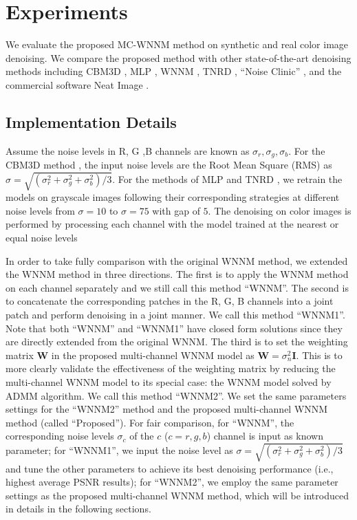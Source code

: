 \documentclass[10pt,twocolumn,letterpaper,sort&compress]{article}
\begin{document}
\section{Experiments}
We evaluate the proposed MC-WNNM method on synthetic and real color image denoising. We compare the proposed method with other state-of-the-art denoising methods including CBM3D \cite{bm3d,cbm3d}, MLP \cite{mlp}, WNNM \cite{wnnm}, TNRD \cite{chen2015learning}, ``Noise Clinic'' \cite{noiseclinic,ncwebsite}, and the commercial software Neat Image \cite{neatimage}.

\subsection{Implementation Details}

Assume the noise levels in R, G ,B channels are known as $\sigma_{r}, \sigma_{g}, \sigma_{b}$. For the CBM3D method \cite{cbm3d}, the input noise levels are the Root Mean Square (RMS) as $\sigma = \sqrt{(\sigma_{r}^{2}+\sigma_{g}^{2}+\sigma_{b}^{2})/3}$. For the methods of MLP \cite{mlp} and TNRD \cite{chen2015learning}, we retrain the models on grayscale images following their corresponding strategies at different noise levels from $\sigma=10$ to $\sigma=75$ with gap of $5$. The denoising on color images is performed by processing each channel with the model trained at the nearest or equal noise levels 

In order to take fully comparison with the original WNNM method, we extended the WNNM method \cite{wnnmijcv} in three directions. The first is to apply the WNNM method on each channel separately and we still call this method ``WNNM''. The second is to concatenate the corresponding patches in the R, G, B channels into a joint patch and perform denoising in a joint manner. We call this method ``WNNM1''. Note that both ``WNNM'' and ``WNNM1'' have closed form solutions since they are directly extended from the original WNNM. The third is to set the weighting matrix $\mathbf{W}$ in the proposed multi-channel WNNM model as $\mathbf{W}=\sigma_{n}^{2}\mathbf{I}$. This is to more clearly validate the effectiveness of the weighting matrix by reducing the multi-channel WNNM model to its special case: the WNNM model solved by ADMM algorithm. We call this method ``WNNM2''. We set the same parameters settings for the ``WNNM2'' method and the proposed multi-channel WNNM method (called ``Proposed''). For fair comparison, for ``WNNM'', the corresponding noise levels $\sigma_{c}$ of the $c$ ($c=r, g, b$) channel is input as known parameter;  for ``WNNM1'', we input the noise level as $\sigma = \sqrt{(\sigma_{r}^{2}+\sigma_{g}^{2}+\sigma_{b}^{2})/3}$ and tune the other parameters to achieve its best denoising performance (i.e., highest average PSNR results); for ``WNNM2'', we employ the same parameter settings as the proposed multi-channel WNNM method, which will be introduced in details in the following sections.
\end{document}

